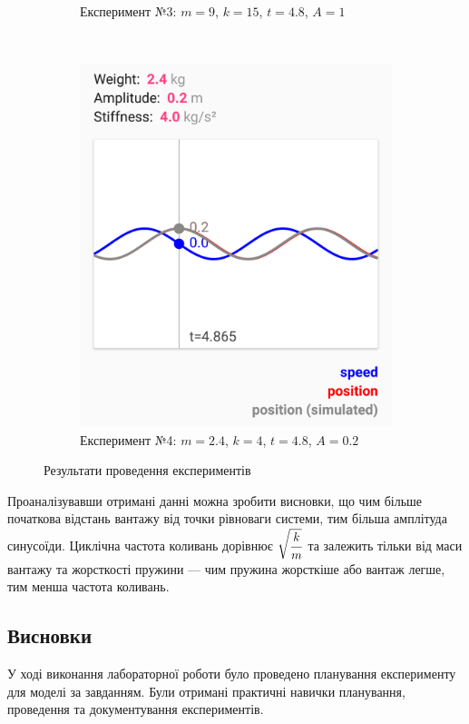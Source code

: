 \begin{figure}[H]
\begin{subfigure}[t]{0.45\linewidth}
    	\caption{Експеримент №3: $m = 9$, $k = 15$, $t = 4.8$, $A = 1$}
    \end{subfigure}
    ~
    \begin{subfigure}[t]{0.45\linewidth}
    	\includegraphics[width=1\linewidth]{experiment4}
    	\caption{Експеримент №4: $m = 2.4$, $k = 4$, $t = 4.8$, $A = 0.2$}
    \end{subfigure}
    \caption{Результати проведення експериментів}
    \label{fig:results}
\end{figure}

Проаналізувавши отримані данні можна зробити висновки, що чим більше початкова відстань вантажу від точки рівноваги системи, тим більша амплітуда синусоїди. 
Циклічна частота коливань дорівнює $\sqrt{\cfrac{k}{m}}$ та залежить тільки від маси вантажу та жорсткості пружини --- чим пружина жорсткіше або вантаж легше, тим менша частота коливань.

\subsection*{Висновки}
У ході виконання лабораторної роботи було проведено планування експерименту для моделі за завданням.
Були отримані практичні навички планування, проведення та документування експериментів.


